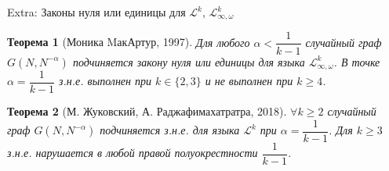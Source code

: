 \documentclass[aspectratio=169,hyperref={unicode},notheorems]{beamer}
\newtheorem {theorem}{Теорема}
\theoremstyle{definition}
\def \LL     {\mathcal{L}}
\def \Gna {G\left(N,N^{-\alpha}\right)}
\begin{document}
\begin{frame}{Extra: Законы нуля или единицы для $\LL^k$, $\LL^k_{\infty, \omega}$}
\begin{theorem} [Моника MакАртур, 1997]
Для любого $\alpha < \dfrac{1}{k-1}$ случайный граф $G(N, N^{-\alpha})$ подчиняется закону нуля или единицы для языка $\LL^k_{\infty, \omega}$.
В точке $\alpha = \dfrac{1}{k-1}$ з.н.е. выполнен при $k \in \{2,3\}$ и не выполнен при $k \geq 4$.
\end{theorem}
\begin{theorem} [М. Жуковский, А. Раджафимахатратра, 2018]
$\forall k\geq2$ случайный граф $\Gna$ подчиняется з.н.е. для языка $\LL^k$ при $\alpha = \dfrac{1}{k-1}$.
Для $k \geq 3$ з.н.е. нарушается в любой правой полуокрестности $\dfrac{1}{k-1}$.
\end{theorem}
\end{frame}
\end{document}
